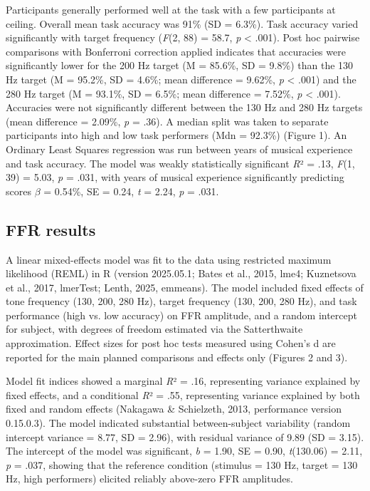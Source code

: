 Participants generally performed well at the task with a few participants at ceiling. Overall mean task accuracy was 91\% (SD = 6.3\%). Task accuracy varied significantly with target frequency (\textit{F}(2, 88) = 58.7, \textit{p} < .001). Post hoc pairwise comparisons with Bonferroni correction applied indicates that accuracies were significantly lower for the 200 Hz target (M = 85.6\%, SD = 9.8\%) than the 130 Hz target (M = 95.2\%, SD = 4.6\%; mean difference = 9.62\%, \textit{p} < .001) and the 280 Hz target (M = 93.1\%, SD = 6.5\%; mean difference = 7.52\%, \textit{p} < .001). Accuracies were not significantly different between the 130 Hz and 280 Hz targets (mean difference = 2.09\%, \textit{p} = .36). A median split was taken to separate participants into high and low task performers (Mdn = 92.3\%) (Figure 1). An Ordinary Least Squares regression was run between years of musical experience and task accuracy. The model was weakly statistically significant \textit{R}² = .13, \textit{F}(1, 39) = 5.03, \textit{p} = .031, with years of musical experience significantly predicting scores $\beta$ = 0.54\%, SE  = 0.24, \textit{t} = 2.24, \textit{p} = .031.





\subsection*{FFR results}
A linear mixed-effects model was fit to the data using restricted maximum likelihood (REML) in R (version 2025.05.1; Bates et al., 2015, lme4; Kuznetsova et al., 2017, lmerTest; Lenth, 2025, emmeans). The model included fixed effects of tone frequency (130, 200, 280 Hz), target frequency (130, 200, 280 Hz), and task performance (high vs. low accuracy) on FFR amplitude, and a random intercept for subject, with degrees of freedom estimated via the Satterthwaite approximation. Effect sizes for post hoc tests measured using Cohen’s d are reported for the main planned comparisons and effects only (Figures 2 and 3). 

Model fit indices showed a marginal \textit{R}² = .16, representing variance explained by fixed effects, and a conditional \textit{R}² = .55, representing variance explained by both fixed and random effects (Nakagawa \& Schielzeth, 2013, performance version 0.15.0.3). The model indicated substantial between-subject variability (random intercept variance = 8.77, SD = 2.96), with residual variance of 9.89 (SD = 3.15). The intercept of the model was significant, \textit{b} = 1.90, SE = 0.90, \textit{t}(130.06) = 2.11, \textit{p} = .037, showing that the reference condition (stimulus = 130 Hz, target = 130 Hz, high performers) elicited reliably above-zero FFR amplitudes.

